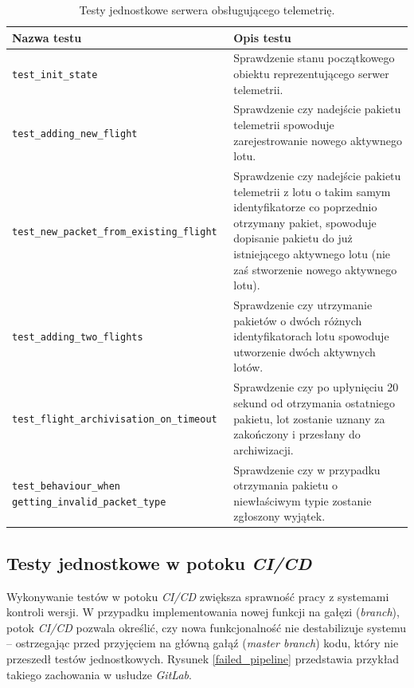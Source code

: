 \begin{table}[H]
	\centering\small
	\caption{
        Testy jednostkowe serwera obsługującego telemetrię.
	}
	\label{telem_server_unit_tests}
    
    \begin{tabularx}{\textwidth} { 
        | >{\raggedright\arraybackslash}X 
        | >{\raggedright\arraybackslash}X | }
        \hline
        \textbf{Nazwa testu} & \textbf{Opis testu} \\
        \hline
        \texttt{test\_init\_state} & Sprawdzenie stanu początkowego obiektu reprezentującego serwer telemetrii. \\
        \hline
        \texttt{test\_adding\_new\_flight} & Sprawdzenie czy nadejście pakietu telemetrii spowoduje zarejestrowanie nowego aktywnego lotu. \\
        \hline
        \texttt{test\_new\_packet\_from\_existing\_flight  } & Sprawdzenie czy nadejście pakietu telemetrii z lotu o takim samym identyfikatorze co poprzednio otrzymany pakiet, spowoduje dopisanie pakietu do już istniejącego aktywnego lotu (nie zaś stworzenie nowego aktywnego lotu).\\
        \hline
        \texttt{test\_adding\_two\_flights} & Sprawdzenie czy utrzymanie pakietów o dwóch różnych identyfikatorach lotu spowoduje utworzenie dwóch aktywnych lotów. \\
        \hline
        \texttt{test\_flight\_archivisation\_on\_timeout} & Sprawdzenie czy po upłynięciu 20 sekund od otrzymania ostatniego pakietu, lot zostanie uznany za zakończony i przesłany do archiwizacji. \\
        \hline
        \texttt{test\_behaviour\_when} \texttt{getting\_invalid\_packet\_type} & Sprawdzenie czy w przypadku otrzymania pakietu o niewłaściwym typie zostanie zgłoszony wyjątek. \\
        \hline
     \end{tabularx}
\end{table}

\subsection{Testy jednostkowe w potoku \textit{CI/CD}}
Wykonywanie testów w potoku \textit{CI/CD} zwiększa sprawność
pracy z systemami kontroli wersji. W przypadku implementowania nowej 
funkcji na gałęzi (\textit{branch}), potok \textit{CI/CD} pozwala określić,
czy nowa funkcjonalność nie destabilizuje systemu -- ostrzegając przed 
przyjęciem na główną gałąź (\textit{master branch}) kodu, który nie przeszedł
testów jednostkowych. Rysunek \ref{failed_pipeline} przedstawia przykład
takiego zachowania w usłudze \textit{GitLab}.

